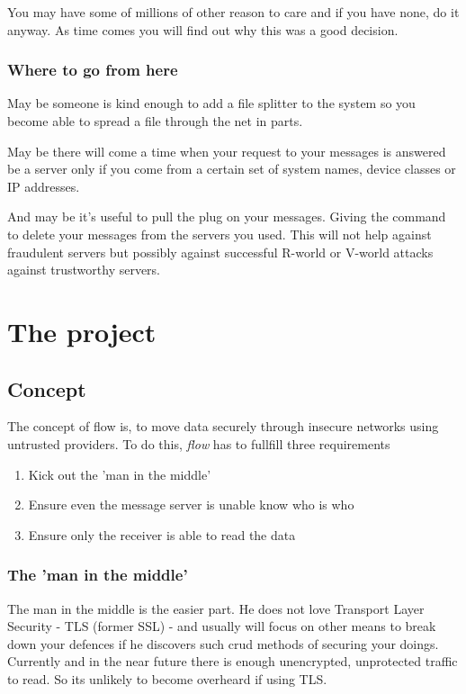 \documentclass[twoside,a4paper,english,12pt,authoryear,openright]{book}
\newcommand{\flow}{\textit{flow} }
\begin{document}
You may have some of millions of other reason to care and if you have none, do it anyway. As time comes you will find out why this was a good decision.

\subsection{Where to go from here}

May be someone is kind enough to add a file splitter to the system so you become able to spread a file through the net in parts.

May be there will come a time when your request to your messages is answered be a server only if you come from a certain set of system names, device classes or IP addresses.

And may be it's useful to pull the plug on your messages. Giving the command to delete your messages from the servers you used. This will not help against fraudulent servers but possibly against successful R-world or V-world attacks against trustworthy servers.

\chapter{The project}

\section{Concept}

The concept of flow is, to move data securely through insecure networks using untrusted providers. To do this, \flow has to fullfill three requirements

\begin{enumerate}
\item{Kick out the 'man in the middle'}
\item{Ensure even the message server is unable know who is who}
\item{Ensure only the receiver is able to read the data}
\end{enumerate}

\subsection{The 'man in the middle'}

The man in the middle is the easier part. He does not love Transport Layer Security - TLS (former SSL) - and usually will focus on other means to break down your defences if he discovers such crud methods of securing your doings. Currently and in the near future there is enough unencrypted, unprotected traffic to read. So its unlikely to become overheard if using TLS.
\end{document}
